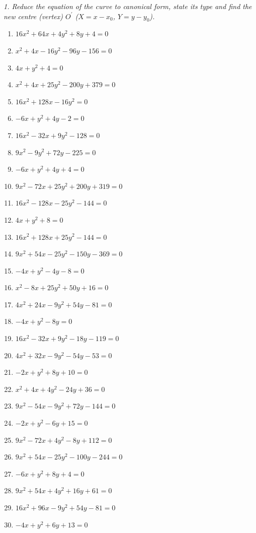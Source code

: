 \emph{1. Reduce the equation of the curve to canonical form, state its type and find the new centre (vertex) $O^{\prime}$ ($X=x-x_0$, $Y=y-y_0$).}
\bigskip
\begin{enumerate}[label=\arabic*., leftmargin=*]
\item $16 x^{2} + 64 x + 4 y^{2} + 8 y + 4=0$
\item $x^{2} + 4 x - 16 y^{2} - 96 y - 156=0$
\item $4 x + y^{2} + 4=0$
\item $x^{2} + 4 x + 25 y^{2} - 200 y + 379=0$
\item $16 x^{2} + 128 x - 16 y^{2}=0$
\item $- 6 x + y^{2} + 4 y - 2=0$
\item $16 x^{2} - 32 x + 9 y^{2} - 128=0$
\item $9 x^{2} - 9 y^{2} + 72 y - 225=0$
\item $- 6 x + y^{2} + 4 y + 4=0$
\item $9 x^{2} - 72 x + 25 y^{2} + 200 y + 319=0$
\item $16 x^{2} - 128 x - 25 y^{2} - 144=0$
\item $4 x + y^{2} + 8=0$
\item $16 x^{2} + 128 x + 25 y^{2} - 144=0$
\item $9 x^{2} + 54 x - 25 y^{2} - 150 y - 369=0$
\item $- 4 x + y^{2} - 4 y - 8=0$
\item $x^{2} - 8 x + 25 y^{2} + 50 y + 16=0$
\item $4 x^{2} + 24 x - 9 y^{2} + 54 y - 81=0$
\item $- 4 x + y^{2} - 8 y=0$
\item $16 x^{2} - 32 x + 9 y^{2} - 18 y - 119=0$
\item $4 x^{2} + 32 x - 9 y^{2} - 54 y - 53=0$
\item $- 2 x + y^{2} + 8 y + 10=0$
\item $x^{2} + 4 x + 4 y^{2} - 24 y + 36=0$
\item $9 x^{2} - 54 x - 9 y^{2} + 72 y - 144=0$
\item $- 2 x + y^{2} - 6 y + 15=0$
\item $9 x^{2} - 72 x + 4 y^{2} - 8 y + 112=0$
\item $9 x^{2} + 54 x - 25 y^{2} - 100 y - 244=0$
\item $- 6 x + y^{2} + 8 y + 4=0$
\item $9 x^{2} + 54 x + 4 y^{2} + 16 y + 61=0$
\item $16 x^{2} + 96 x - 9 y^{2} + 54 y - 81=0$
\item $- 4 x + y^{2} + 6 y + 13=0$
\end{enumerate}

